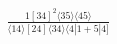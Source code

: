 \documentclass[varwidth, border=5pt]{standalone}
\begin{document}
\begin{my}
$\begin{gathered}
\scriptscriptstyle\frac{1[34]^2⟨35⟩⟨45⟩}{⟨14⟩[24]⟨34⟩⟨4|1+5|4]}
\end{gathered}$
\end{my}
\end{document}
